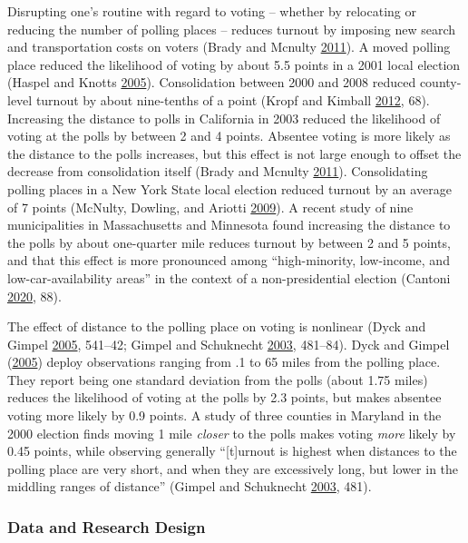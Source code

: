 \documentclass[
  12pt,
]{article}
\begin{document}
Disrupting one's routine with regard to voting -- whether by relocating or reducing the number of polling places -- reduces turnout by imposing new search and transportation costs on voters (Brady and Mcnulty \protect\hyperlink{ref-Brady2011}{2011}). A moved polling place reduced the likelihood of voting by about 5.5 points in a 2001 local election (Haspel and Knotts \protect\hyperlink{ref-Haspel2005}{2005}). Consolidation between 2000 and 2008 reduced county-level turnout by about nine-tenths of a point (Kropf and Kimball \protect\hyperlink{ref-Kropf2012}{2012}, 68). Increasing the distance to polls in California in 2003 reduced the likelihood of voting at the polls by between 2 and 4 points. Absentee voting is more likely as the distance to the polls increases, but this effect is not large enough to offset the decrease from consolidation itself (Brady and Mcnulty \protect\hyperlink{ref-Brady2011}{2011}). Consolidating polling places in a New York State local election reduced turnout by an average of 7 points (McNulty, Dowling, and Ariotti \protect\hyperlink{ref-McNulty2009}{2009}). A recent study of nine municipalities in Massachusetts and Minnesota found increasing the distance to the polls by about one-quarter mile reduces turnout by between 2 and 5 points, and that this effect is more pronounced among ``high-minority, ­low-income, and low-car-availability areas'' in the context of a non-presidential election (Cantoni \protect\hyperlink{ref-Cantoni2020}{2020}, 88).

The effect of distance to the polling place on voting is nonlinear (Dyck and Gimpel \protect\hyperlink{ref-Dyck2005}{2005}, 541--42; Gimpel and Schuknecht \protect\hyperlink{ref-Gimpel2003}{2003}, 481--84). Dyck and Gimpel (\protect\hyperlink{ref-Dyck2005}{2005}) deploy observations ranging from .1 to 65 miles from the polling place. They report being one standard deviation from the polls (about 1.75 miles) reduces the likelihood of voting at the polls by 2.3 points, but makes absentee voting more likely by 0.9 points. A study of three counties in Maryland in the 2000 election finds moving 1 mile \emph{closer} to the polls makes voting \emph{more} likely by 0.45 points, while observing generally ``{[}t{]}urnout is highest when distances to the polling place are very short, and when they are excessively long, but lower in the middling ranges of distance'' (Gimpel and Schuknecht \protect\hyperlink{ref-Gimpel2003}{2003}, 481).

\hypertarget{data-and-research-design}{%
\subsubsection*{Data and Research Design}\label{data-and-research-design}}
\end{document}
